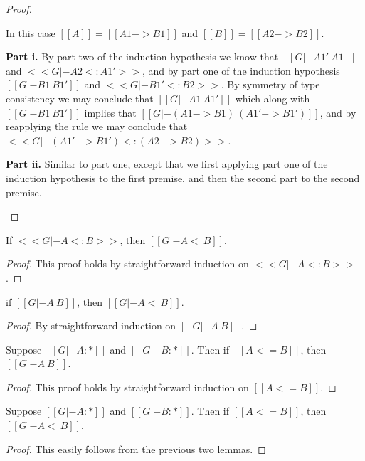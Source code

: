 \begin{proof}
\begin{itemize}
    In this case $[[A]] = [[A1 -> B1]]$ and $[[B]] = [[A2 -> B2]]$.

    \noindent
    \textbf{Part i.} By part two of the induction hypothesis we know
    that $[[G |- A1' ~ A1]]$ and $<<G |- A2 <: A1'>>$, and by part one of the induction hypothesis
    $[[G |- B1 ~ B1']]$ and $<<G |- B1' <: B2>>$.  By symmetry of type consistency
    we may conclude that $[[G |- A1 ~ A1']]$ which along with $[[G |- B1 ~ B1']]$
    implies that $[[G |- (A1 -> B1) ~ (A1' -> B1')]]$, and by reapplying the rule
    we may conclude that $<<G |- (A1' -> B1') <: (A2 -> B2)>>$.

    \noindent
    \textbf{Part ii.} Similar to part one, except that we first
    applying part one of the induction hypothesis to the first
    premise, and then the second part to the second premise.
    
  \end{itemize}

\end{proof}

\begin{lemma}
  \label{lemma:consistent-subtyping-2}
  If $<<G |- A <: B>>$, then $[[G |- A <~ B]]$.
\end{lemma}
\begin{proof}
  This proof holds by straightforward induction on $<<G |- A <: B>>$.
\end{proof}

\begin{lemma}
  \label{lemma:consistent-subtyping-3}
  if $[[G |- A ~ B]]$, then $[[G |- A <~ B]]$.
\end{lemma}
\begin{proof}
  By straightforward induction on $[[G |- A ~ B]]$.
\end{proof}

\begin{lemma}
  \label{lemma:type_precision_and_consistency}
  Suppose $[[G |- A : *]]$ and $[[G |- B : *]]$.  Then
  if $[[A <= B]]$, then $[[G |- A ~ B]]$.
\end{lemma}
\begin{proof}
  This proof holds by straightforward induction on $[[A <= B]]$.
\end{proof}

\begin{corollary}
  \label{corollary:type_precision_and_subtyping}
  Suppose $[[G |- A : *]]$ and $[[G |- B : *]]$.  Then
  if $[[A <= B]]$, then $[[G |- A <~ B]]$.
\end{corollary}
\begin{proof}
  This easily follows from the previous two lemmas.
\end{proof}


